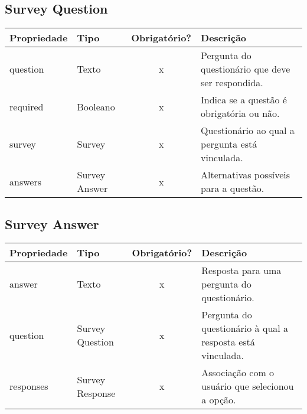 \subsection{Survey Question} \label{Survey Question}
\begin{table}[H]
	\footnotesize
	\begin{tabularx}{\textwidth}{|X|X|c|p{7.8cm}|}   \hline \rowcolor[rgb]{0.8,0.8,0.8}
		
		\textbf{Propriedade} & \textbf{Tipo} & \textbf{Obrigatório?} & \centerline{\textbf{Descrição}} \\\hline  	
		
		question & Texto & x & Pergunta do questionário que deve ser respondida. \\\hline			
		required & Booleano & x & Indica se a questão é obrigatória ou não. \\\hline	
		survey & Survey & x & Questionário ao qual a pergunta está vinculada. \\\hline
		answers & Survey Answer & x & Alternativas possíveis para a questão. \\\hline	
		
	\end{tabularx}	
\end{table}


\subsection{Survey Answer} \label{Survey Answer}
\begin{table}[H]
	\footnotesize
	\begin{tabularx}{\textwidth}{|X|X|c|p{7.8cm}|}   \hline \rowcolor[rgb]{0.8,0.8,0.8}
		
		\textbf{Propriedade} & \textbf{Tipo} & \textbf{Obrigatório?} & \centerline{\textbf{Descrição}} \\\hline  	
		
		answer & Texto & x & Resposta para uma pergunta do questionário. \\\hline
		question & Survey Question & x & Pergunta do questionário à qual a resposta está vinculada. \\\hline
		responses & Survey Response & x	& Associação com o usuário que selecionou a opção. \\\hline 		
		
	\end{tabularx}	
\end{table}


